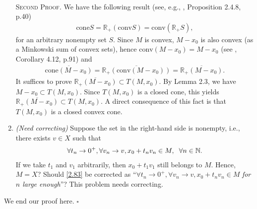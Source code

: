 \documentclass[a4paper]{article}
\numberwithin{equation}{section}
\begin{document}
\begin{enumerate}
\\
\textsc{Second Proof.} We have the following result (see, e.g., \cite{2}, Proposition 2.4.8, p.40)
\begin{align}
\mbox{cone}S = {\mathbb{R}_ + }\left( {\mbox{conv}S} \right) = \mbox{conv} \left( {{\mathbb{R}_ + }S} \right),
\end{align}
for an arbitrary nonempty set $S$. Since $M$ is convex, $M-x_0$ is also convex (as a Minkowski sum of convex sets), hence $\mbox{conv}\left( {M - {x_0}} \right) = M - {x_0}$ (see \cite{1}, Corollary 4.12, p.91) and 
\begin{align}
\overline {\mbox{cone}\left( {M - {x_0}} \right)}  = \overline {{\mathbb{R}_ + }\left( {\mbox{conv}\left( {M - {x_0}} \right)} \right)}  = \overline {{\mathbb{R}_ + }\left( {M - {x_0}} \right)}.
\end{align}
It suffices to prove $\overline {{\mathbb{R}_ + }\left( {M - {x_0}} \right)}  \subset T\left( {M,{x_0}} \right)$. By Lemma 2.3, we have $M - {x_0} \subset T\left( {M,{x_0}} \right)$. Since $T\left(M,x_0\right)$ is a closed cone, this yields $\overline {{\mathbb{R}_ + }\left( {M - {x_0}} \right)}  \subset T\left( {M,{x_0}} \right)$. A direct consequence of this fact is that $T\left(M,x_0\right)$ is a closed convex cone.
\item \textit{(Need correcting)} Suppose the set in the right-hand side is nonempty, i.e., there exists $v\in X$ such that 
\begin{align}
\label{2.83}
\forall {t_n} \to {0^ + },\forall {v_n} \to v,{x_0} + {t_n}{v_n} \in M,\hspace{0.2cm}\forall n \in \mathbb{N}.
\end{align}
If we take $t_1$ and $v_1$ arbitrarily, then $x_0+t_1 v_1$ still belongs to $M$. Hence, $M=X$? Should \eqref{2.83} be corrected as ``$\forall {t_n} \to {0^ + },\forall {v_n} \to v,{x_0} + {t_n}{v_n} \in M$ \textit{for $n$ large enough}''? This problem needs correcting.
\end{enumerate}
We end our proof here. \hfill $\square$\\
\end{document}
